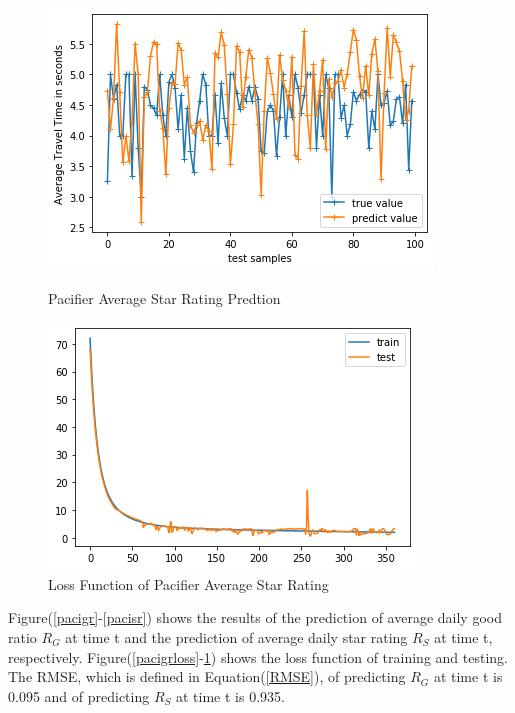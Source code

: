 \documentclass[12pt]{article}
\begin{document}
\begin{figure}[!htb]
   \begin{minipage}{0.48\textwidth}
     \centering
     \includegraphics[width=.8\linewidth]{pacifer_prediction_0935.png} %
     \caption{Pacifier Average Star Rating Predtion}\label{pacisr}
   \end{minipage}\hfill
   \begin{minipage}{0.48\textwidth}
     \centering
     \includegraphics[width=.8\linewidth]{pacifier_loss.png}
     \caption{Loss Function of Pacifier Average Star Rating}\label{pacisrloss}
   \end{minipage}
\end{figure} 

Figure(\ref{pacigr}-\ref{pacisr}) shows the results of the prediction of average daily good ratio $R_{G}$ at time t and the prediction of average daily star rating $R_{S}$ at time t, respectively. Figure(\ref{pacigrloss}-\ref{pacisrloss}) shows the loss function of training and testing. The RMSE, which is defined in Equation(\ref{RMSE}), of predicting $R_{G}$ at time t is 0.095 and of predicting $R_{S}$ at time t is 0.935. 
\end{document}
